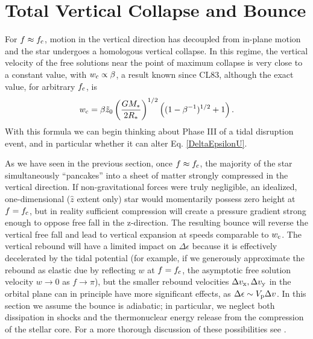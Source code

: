 \documentclass[useAMS, twocolumn, usenatbib]{mn2e}
\begin{document}
\section{Total Vertical Collapse and Bounce}
For $f\approx f_{\rm c}$, motion in the vertical direction has decoupled from in-plane motion and the star undergoes a homologous vertical collapse.  In this regime, the vertical velocity of the free solutions near the point of maximum collapse is very close to a constant value, with $w_{\rm c} \propto \beta$, a result known since CL83, although the exact value, for arbitrary $f_{\rm c}$, is
\begin{equation}
w_{\rm c}=\beta \tilde{z}_0 \left( \frac{GM_*}{2R_*} \right)^{1/2}\left( (1-\beta^{-1})^{1/2} + 1  \right) \label{uc}.
\end{equation}
With this formula we can begin thinking about Phase III of a tidal disruption event, and in particular whether it can alter Eq. \ref{DeltaEpsilonU}.

As we have seen in the previous section, once $f\approx f_{\rm c}$, the majority of the star simultaneously ``pancakes'' into a sheet of matter strongly compressed in the vertical direction.  If non-gravitational forces were truly negligible, an idealized, one-dimensional ($\hat{z}$ extent only) star would momentarily possess zero height at $f=f_{\rm c}$, but in reality sufficient compression will create a pressure gradient strong enough to oppose free fall in the z-direction.  The resulting bounce will reverse the vertical free fall and lead to vertical expansion at speeds comparable to $w_{\rm c}$.  The vertical rebound will have a limited impact on $\Delta \epsilon$ because it is effectively decelerated by the tidal potential (for example, if we generously approximate the rebound as elastic due by reflecting $w$ at $f=f_{\rm c}$, the asymptotic free solution velocity $w\to 0$ as $f\to \pi$), but the smaller rebound velocities $\Delta v_{\rm x}, \Delta v_{\rm y}$ in the orbital plane can in principle have more significant effects, as $\Delta \epsilon \sim V_{\rm p}\Delta v$.  In this section we assume the bounce is adiabatic; in particular, we neglect both dissipation in shocks and the thermonuclear energy release from the compression of the stellar core.  For a more thorough discussion of these possibilities see \citet{LuminetPichon89, BrassartLuminet08}.
\end{document}
